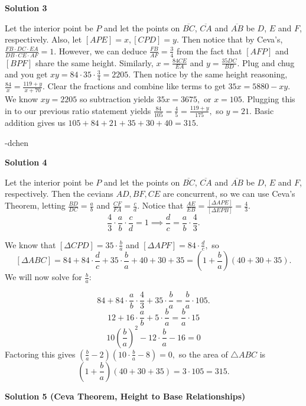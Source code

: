 \begin{enumerate}
\textbf{Solution 3}

Let the interior point be $P$ and let the points on $\overline{BC}$, $\overline{CA}$ and $\overline{AB}$ be $D$, $E$ and $F$, respectively. Also, let $[APE]=x,[CPD]=y.$ Then notice that by Ceva's, $\frac{FB\cdot DC\cdot EA}{DB\cdot CE\cdot AF}=1.$ However, we can deduce $\frac{FB}{AF}=\frac{3}{4}$ from the fact that $[AFP]$ and $[BPF]$ share the same height. Similarly, $x=\frac{84CE}{EA}$ and $y=\frac{35DC}{BD}.$ Plug and chug and you get $xy=84\cdot 35\cdot \frac{3}{4}=2205.$ Then notice by the same height reasoning, $\frac{84}{x}=\frac{119+y}{x+70}.$ Clear the fractions and combine like terms to get $35x=5880-xy.$ We know $xy=2205$ so subtraction yields $35x=3675,$ or $x=105.$ Plugging this in to our previous ratio statement yields $\frac{84}{105}=\frac{4}{5}=\frac{119+y}{175},$ so $y=21.$ Basic addition gives us $105+84+21+35+30+40=\boxed{315}.$

 -dchen

 



\textbf{Solution 4}

Let the interior point be $P$ and let the points on $\overline{BC}$, $\overline{CA}$ and $\overline{AB}$ be $D$, $E$ and $F$, respectively. Then the cevians $AD,BF,CE$ are concurrent, so we can use Ceva's Theorem, letting $\frac{BD}{DC}=\frac{a}{b}$ and $\frac{CF}{FA}=\frac{c}{d}$. Notice that $\frac{AE}{EB}=\frac{[\Delta APE]}{[\Delta EPB]}=\frac43.$ 
 \[\frac{4}{3}\cdot \frac{a}{b}\cdot \frac{c}{d}=1\implies \frac{d}{c}=\frac{a}{b}\cdot \frac{4}{3}.\]

 We know that $[\Delta CPD]=35\cdot \frac ba$ and $[\Delta APF]=84\cdot \frac dc,$ so
 \[[\Delta ABC] = 84+84\cdot \frac dc + 35\cdot \frac ba + 40+30+35 = \left(1+\frac ba\right)(40+30+35).\]We will now solve for $\frac ba$:

 
 \[84+84\cdot \frac ab\cdot \frac 43 + 35\cdot \frac ba = \frac ba\cdot 105.\]
 \[12+16\cdot \frac ab + 5\cdot \frac ba = \frac ba\cdot 15\]
 \[10\left(\frac ba\right)^2-12\cdot \frac ba-16=0\]Factoring this gives $\left(\frac ba-2\right)\left(10\cdot \frac ba - 8\right)=0,$ so the area of $\triangle ABC$ is
 \[\left(1+\frac ba\right)(40+30+35)=3\cdot 105=\boxed{315.}\]




\textbf{Solution 5 (Ceva Theorem, Height to Base Relationships)}


\end{enumerate}
